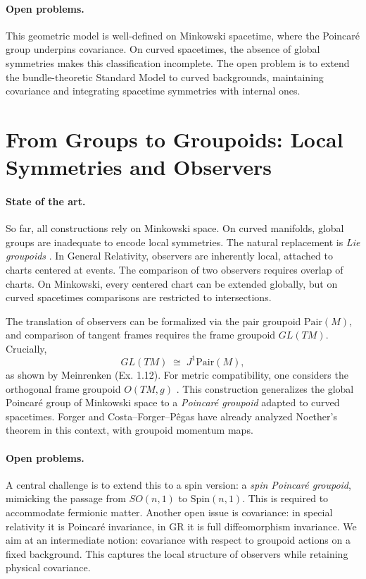 \documentclass[11pt,a4paper]{article}
\begin{document}
\paragraph{Open problems.}
This geometric model is well-defined on Minkowski spacetime, where the Poincaré group underpins covariance. On curved spacetimes, the absence of global symmetries makes this classification incomplete. The open problem is to extend the bundle-theoretic Standard Model to curved backgrounds, maintaining covariance and integrating spacetime symmetries with internal ones.

\section{From Groups to Groupoids: Local Symmetries and Observers}

\paragraph{State of the art.}
So far, all constructions rely on Minkowski space. On curved manifolds, global groups are inadequate to encode local symmetries. The natural replacement is \emph{Lie groupoids} \cite{Meinrenken,Mackenzie,CostaForgerPegas,WeinsteinGroupoids}. In General Relativity, observers are inherently local, attached to charts centered at events. The comparison of two observers requires overlap of charts. On Minkowski, every centered chart can be extended globally, but on curved spacetimes comparisons are restricted to intersections.  

The translation of observers can be formalized via the pair groupoid $\mathrm{Pair}(M)$, and comparison of tangent frames requires the frame groupoid $GL(TM)$. Crucially,
$$
GL(TM) \;\cong\; J^1 \mathrm{Pair}(M),
$$
as shown by Meinrenken (Ex. 1.12). For metric compatibility, one considers the orthogonal frame groupoid $O(TM,g)$ \cite{Meinrenken}. This construction generalizes the global Poincaré group of Minkowski space to a \emph{Poincaré groupoid} adapted to curved spacetimes. Forger and Costa–Forger–Pêgas \cite{CostaForgerPegas} have already analyzed Noether’s theorem in this context, with groupoid momentum maps.

\paragraph{Open problems.}
A central challenge is to extend this to a spin version: a \emph{spin Poincaré groupoid}, mimicking the passage from $SO(n,1)$ to $\mathrm{Spin}(n,1)$. This is required to accommodate fermionic matter. Another open issue is covariance: in special relativity it is Poincaré invariance, in GR it is full diffeomorphism invariance. We aim at an intermediate notion: covariance with respect to groupoid actions on a fixed background. This captures the local structure of observers while retaining physical covariance.
\end{document}
